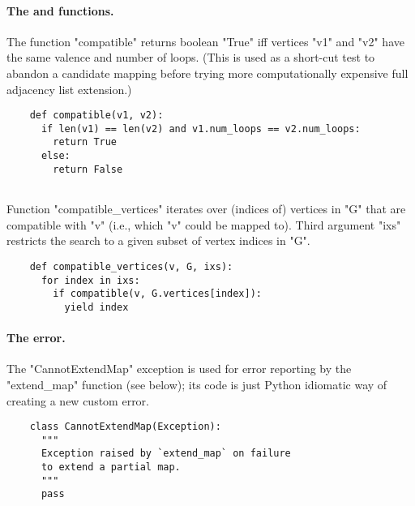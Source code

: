 \paragraph{The  and  functions.}
The function "compatible" returns boolean "True" iff vertices "v1" and
"v2" have the same valence and number of loops.  (This is used as a
short-cut test to abandon a candidate mapping before trying more
computationally expensive full adjacency list extension.)
\begin{lstlisting}
    def compatible(v1, v2):
      if len(v1) == len(v2) and v1.num_loops == v2.num_loops:
        return True
      else:
        return False
        
\end{lstlisting}
Function "compatible_vertices" iterates over (indices of)
vertices in "G" that are compatible with "v" (i.e., which "v" could be
mapped to). Third argument "ixs" restricts the search to a given
subset of vertex indices in "G".
\begin{lstlisting}
    def compatible_vertices(v, G, ixs):
      for index in ixs:
        if compatible(v, G.vertices[index]):
          yield index

\end{lstlisting}

\paragraph{The  error.}
The "CannotExtendMap" exception is used for error reporting by the
"extend_map" function (see below); its code is just Python idiomatic
way of creating a new custom error.
\begin{lstlisting}
    class CannotExtendMap(Exception):
      """
      Exception raised by `extend_map` on failure
      to extend a partial map.
      """
      pass

\end{lstlisting}

